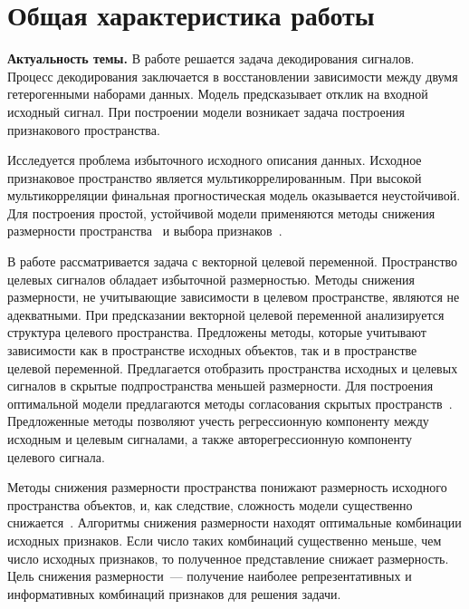 \documentclass[11pt, a5paper]{dissert}
\begin{document}
\clearpage




\section*{Общая характеристика работы}
\label{ch:Intro}

\textbf{Актуальность темы.} 
В работе решается задача декодирования сигналов. 
Процесс декодирования заключается в восстановлении зависимости между двумя гетерогенными наборами данных.
Модель предсказывает отклик на входной исходный сигнал.
При построении модели возникает задача построения признакового пространства. 

Исследуется проблема избыточного исходного описания данных. 
Исходное признаковое пространство является мультикоррелированным.
При высокой мультикорреляции финальная прогностическая модель оказывается неустойчивой.
Для построения простой, устойчивой модели применяются методы снижения размерности пространства~\cite{motrenko2018multi,chun2010sparse,mehmood2012review}  и выбора признаков~\cite{katrutsa2017comprehensive,li2017feature}.

В работе рассматривается задача с векторной целевой переменной. 
Пространство целевых сигналов обладает избыточной размерностью. 
Методы снижения размерности, не учитывающие зависимости в целевом пространстве, являются не адекватными.
При предсказании векторной целевой переменной анализируется структура целевого пространства.
Предложены методы, которые учитывают зависимости как в пространстве исходных объектов, так и в пространстве целевой переменной.
Предлагается отобразить пространства исходных и целевых сигналов в скрытые подпространства меньшей размерности.
Для построения оптимальной модели предлагаются методы согласования скрытых пространств~\cite{wold1975path,rosipal2005overview,eliseyev2017recursive}.
Предложенные методы позволяют учесть регрессионную компоненту между исходным и целевым сигналами, а также авторегрессионную компоненту целевого сигнала.

Методы снижения размерности пространства понижают размерность исходного пространства объектов, и, как следствие, сложность модели существенно снижается~\cite{tipping1999probabilisticpca,wold1975path,hotelling1992relations}. 
Алгоритмы снижения размерности находят оптимальные комбинации исходных признаков. 
Если число таких комбинаций существенно меньше, чем число исходных признаков, то полученное представление снижает размерность.
Цель снижения размерности~--- получение наиболее репрезентативных и информативных комбинаций признаков для решения задачи.
\end{document}
